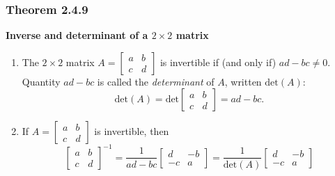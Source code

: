 \documentclass{report}
\begin{document}
\subsubsection*{Theorem 2.4.9}
\par\noindent\textbf{Inverse and determinant of a $2\times{}2$ matrix}
\renewcommand{\labelenumi}{\textbf{\alph{enumi}.}}
\begin{enumerate}
\item The $2\times{}2$ matrix $A=\left[\begin{array}{cc}a&b\\ c&d\end{array}\right]$ is invertible if (and only if) $ad-bc\ne{}0$. Quantity $ad-bc$ is called the \textit{determinant} of $A$, written $\textrm{det}(A)$:
\[\textrm{det}(A)=\textrm{det}\left[\begin{array}{cc}a&b\\ c&d\end{array}\right]=ad-bc.\]
\item If $A=\left[\begin{array}{cc}a&b\\ c&d\end{array}\right]$ is invertible, then
\[\left[\begin{array}{cc}a&b\\ c&d\end{array}\right]^{-1}=\frac{1}{ad-bc}\left[\begin{array}{rr}d&-b\\ -c&a\end{array}\right]=\frac{1}{\textrm{det}(A)}\left[\begin{array}{rr}d&-b\\ -c&a\end{array}\right]\]
\end{enumerate}
\end{document}
